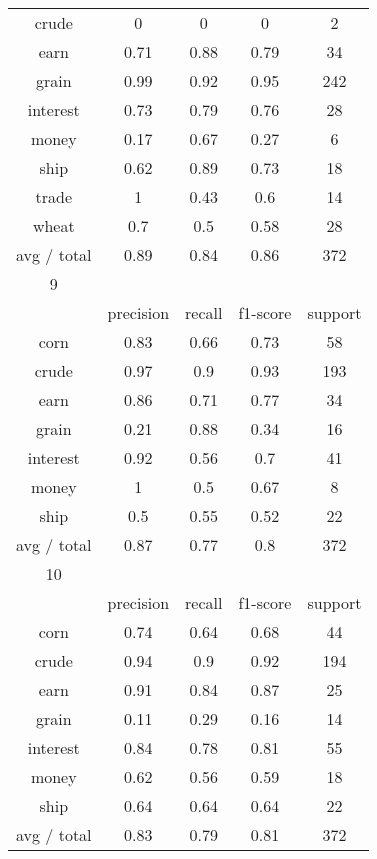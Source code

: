 \documentclass[11pt]{article}
\begin{document}
\begin{center}
\begin{longtable}{| c | c | c | c | c |}
crude       & 0         & 0      & 0        & 2       \\
earn        & 0.71      & 0.88   & 0.79     & 34      \\
grain       & 0.99      & 0.92   & 0.95     & 242     \\
interest    & 0.73      & 0.79   & 0.76     & 28      \\
money       & 0.17      & 0.67   & 0.27     & 6       \\
ship        & 0.62      & 0.89   & 0.73     & 18      \\
trade       & 1         & 0.43   & 0.6      & 14      \\
wheat       & 0.7       & 0.5    & 0.58     & 28      \\

avg / total & 0.89      & 0.84   & 0.86     & 372     \\
\hline

9           &           &        &          &         \\
\hline
           & precision & recall & f1-score & support \\

corn        & 0.83      & 0.66   & 0.73     & 58      \\
crude       & 0.97      & 0.9    & 0.93     & 193     \\
earn        & 0.86      & 0.71   & 0.77     & 34      \\
grain       & 0.21      & 0.88   & 0.34     & 16      \\
interest    & 0.92      & 0.56   & 0.7      & 41      \\
money       & 1         & 0.5    & 0.67     & 8       \\
ship        & 0.5       & 0.55   & 0.52     & 22      \\

avg / total & 0.87      & 0.77   & 0.8      & 372     \\
\hline

10          &           &        &          &         \\
\hline
           & precision & recall & f1-score & support \\

corn        & 0.74      & 0.64   & 0.68     & 44      \\
crude       & 0.94      & 0.9    & 0.92     & 194     \\
earn        & 0.91      & 0.84   & 0.87     & 25      \\
grain       & 0.11      & 0.29   & 0.16     & 14      \\
interest    & 0.84      & 0.78   & 0.81     & 55      \\
money       & 0.62      & 0.56   & 0.59     & 18      \\
ship        & 0.64      & 0.64   & 0.64     & 22      \\

avg / total & 0.83      & 0.79   & 0.81     & 372     \\
\hline
\end{longtable}
\end{center}
\end{document}
